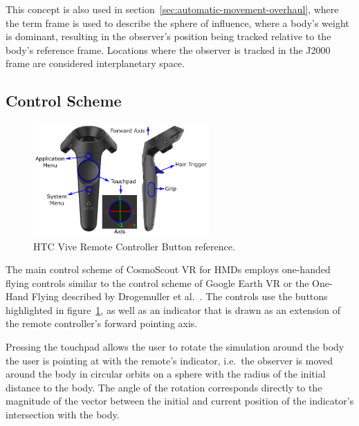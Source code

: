 This concept is also used in section~\ref{sec:automatic-movement-overhaul}, where the term frame is used to describe
the sphere of influence, where a body's weight is dominant, resulting in the observer's position being tracked
relative to the body's reference frame.
Locations where the observer is tracked in the J2000 frame are considered interplanetary space.


\subsection{Control Scheme}\label{subsec:control-scheme}

\begin{figure}[h]
    \centering
    \includegraphics[width=0.6\textwidth]{content/3_current_state/img/ViveControllerButtons[BAA2017]}
    \caption{HTC Vive Remote Controller Button reference\footnotemark.}
    \label{fig:controller-reference}
\end{figure}

The main control scheme of CosmoScout VR for HMDs employs one-handed flying controls similar to the control
scheme of Google Earth VR or the One-Hand Flying described by Drogemuller et al.~\cite{Drogemuller2020}.
The controls use the buttons highlighted in figure~\ref{fig:controller-reference}, as well as an indicator that is
drawn as an extension of the remote controller's forward pointing axis.

Pressing the touchpad allows the user to rotate the simulation around the body the user is pointing at with the
remote's indicator, i.e.\ the observer is moved around the body in circular orbits on a sphere with the radius of the
initial distance to the body.
The angle of the rotation corresponds directly to the magnitude of the vector between the initial and current position
of the indicator's intersection with the body.

